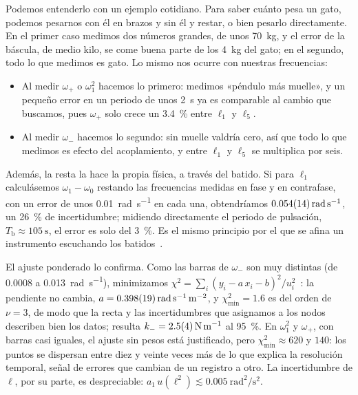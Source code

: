 \documentclass[a4paper,11pt]{amsart}
\numberwithin{equation}{section}
\newcommand{\Tb}{T_{\mathrm{b}}}              %
\newcommand{\wz}{\omega_0}                    %
\newcommand{\wu}{\omega_1}                    %
\newcommand{\wm}{\omega_{-}}                  %
\newcommand{\wpl}{\omega_{+}}                 %
\theoremstyle{cienplano}
\theoremstyle{ciendef}
\theoremstyle{cienobs}
\begin{document}
Podemos entenderlo con un ejemplo cotidiano. Para saber cuánto pesa un gato,
podemos pesarnos con él en brazos y sin él y restar, o bien pesarlo
directamente. En el primer caso medimos dos números grandes, de unos
\SI{70}{\kilogram}, y el error de la báscula, de medio kilo, se come buena
parte de los \SI{4}{\kilogram} del gato; en el segundo, todo lo que medimos es
gato. Lo mismo nos ocurre con nuestras frecuencias:
\begin{itemize}
  \item Al medir $\wpl$ o $\wu^{2}$ hacemos lo primero: medimos «péndulo más
        muelle», y un pequeño error en un periodo de unos \SI{2}{\second} ya
        es comparable al cambio que buscamos, pues $\wpl$ solo crece un
        \SI{3,4}{\percent} entre $\ell_1$ y $\ell_5$.
  \item Al medir $\wm$ hacemos lo segundo: sin muelle valdría cero, así que
        todo lo que medimos es efecto del acoplamiento, y entre $\ell_1$ y
        $\ell_5$ se multiplica por seis.
\end{itemize}

Además, la resta la hace la propia física, a través del batido. Si para
$\ell_1$ calculásemos $\wu-\wz$ restando las frecuencias medidas en fase y en
contrafase, con un error de unos \SI{0,01}{\radian\per\second} en cada una,
obtendríamos $\SI{0,054 \pm 0,014}{\radian\per\second}$, un \SI{26}{\percent} de
incertidumbre; midiendo directamente el periodo de pulsación,
$\Tb\approx\SI{105}{\second}$, el error es solo del \SI{3}{\percent}. Es el mismo
principio por el que se afina un instrumento escuchando los
batidos~\cite{FIV}.

El ajuste ponderado lo confirma. Como las barras de $\wm$ son muy distintas
(de \num{0,0008} a \SI{0,013}{\radian\per\second}), minimizamos
$\chi^{2}=\sum_i(y_i-a\,x_i-b)^{2}/u_i^{2}$~\cite{NUM-ARG}: la pendiente no
cambia, $a=\SI{0,398 \pm 0,019}{\radian\per\second\per\meter\squared}$, y
$\chi^{2}_{\min}=\num{1,6}$ es del orden de $\nu=3$, de modo que la recta y las
incertidumbres que asignamos a los nodos describen bien los datos; resulta
$k_{-}=\SI{2,5 \pm 0,4}{\newton\per\meter}$ al \SI{95}{\percent}. En $\wu^{2}$ y
$\wpl$, con barras casi iguales, el ajuste sin pesos está justificado, pero
$\chi^{2}_{\min}\approx620$ y $140$: los puntos se dispersan entre diez y veinte
veces más de lo que explica la resolución temporal, señal de errores que
cambian de un registro a otro. La incertidumbre de $\ell$, por su parte, es
despreciable: $a_1\,u(\ell^{2})\lesssim\SI{0,005}{\radian\squared\per\second\squared}$.
\end{document}
